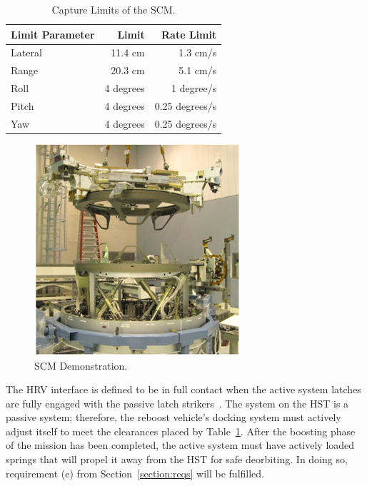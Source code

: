\documentclass[paper=letter, fontsize=11pt]{scrartcl} %
\numberwithin{equation}{section} %
\numberwithin{figure}{section} %
\numberwithin{table}{section} %
\begin{document}
\begin{table}[H]
    \begin{center}
        \begin{tabular}{l r r}
            \toprule
            Limit Parameter & Limit     & Rate Limit     \\
            \midrule
            Lateral         & 11.4 cm   & 1.3 cm/s       \\
            Range           & 20.3 cm   & 5.1 cm/s       \\
            Roll            & 4 degrees & 1 degree/s     \\
            Pitch           & 4 degrees & 0.25 degrees/s \\
            Yaw             & 4 degrees & 0.25 degrees/s \\
            \bottomrule
        \end{tabular}
    \end{center}
    \caption{Capture Limits of the SCM.}
    \label{table:capture_limits}
\end{table}

\begin{figure}[H]
    \begin{center}
        \includegraphics[height=0.4\textheight]{HST_Interface_Figures/H2.png}
        \caption{SCM Demonstration.}
        \label{H2}
    \end{center}
\end{figure}

The HRV interface is defined to be in full contact when the active system latches are fully engaged with the passive latch strikers~\cite{ref5}. The system on the HST is a passive system; therefore, the reboost vehicle's docking system must actively adjust itself to meet the clearances placed by Table~\ref{table:capture_limits}. After the boosting phase of the mission has been completed, the active system must have actively loaded springs that will propel it away from the HST for safe deorbiting. In doing so, requirement (e) from Section~\ref{section:reqs} will be fulfilled.
\end{document}
